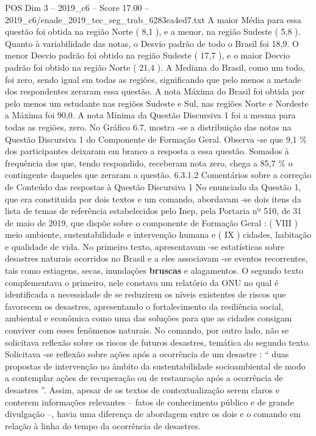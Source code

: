 \begin{textsample}{POS Dim 3 – 2019\_c6 – Score 17.00 – 2019\_c6/enade\_2019\_tec\_seg\_trab\_6283ea4ed7.txt}
A maior Média para essa questão foi obtida na região Norte ( 8,1 ), e a menor, na região Sudeste ( 5,8 ).
Quanto à variabilidade das notas, o Desvio padrão de todo o Brasil foi 18,9.
O menor Desvio padrão foi obtido na região Sudeste ( 17,7 ), e o maior Desvio padrão foi obtido na região Norte ( 21,4 ).
A Mediana do Brasil, como um todo, foi zero, sendo igual em todas as regiões, significando que pelo menos a metade dos respondentes zeraram essa questão.
A nota Máxima do Brasil foi obtida por pelo menos um estudante nas regiões Sudeste e Sul, nas regiões Norte e Nordeste a Máxima foi 90,0.
A nota Mínima da Questão Discursiva 1 foi a mesma para todas as regiões, zero.
No Gráfico 6.7, mostra -se a distribuição das notas na Questão Discursiva 1 do Componente de Formação Geral.
Observa -se que 9,1 \% dos participantes deixaram em branco a resposta a essa questão.
Somados à frequência dos que, tendo respondido, receberam nota zero, chega a 85,7 \% o contingente daqueles que zeraram a questão. 6.3.1.2 Comentários sobre a correção de Conteúdo das respostas à Questão Discursiva 1 No enunciado da Questão 1, que era constituída por dois textos e um comando, abordavam -se dois itens da lista de temas de referência estabelecidos pelo Inep, pela Portaria nº 510, de 31 de maio de 2019, que dispõe sobre o componente de Formação Geral : ( VIII ) meio ambiente, sustentabilidade e intervenção humana e ( IX ) cidades, habitação e qualidade de vida.
No primeiro texto, apresentavam -se estatísticas sobre desastres naturais ocorridos no Brasil e a eles associavam -se eventos recorrentes, tais como estiagens, secas, inundações \textbf{bruscas} e alagamentos.
O segundo texto complementava o primeiro, nele constava um relatório da ONU no qual é identificada a necessidade de se reduzirem os níveis existentes de riscos que favorecem os desastres, apresentando o fortalecimento da resiliência social, ambiental e econômica como uma das soluções para que as cidades consigam conviver com esses fenômenos naturais.
No comando, por outro lado, não se solicitava reflexão sobre os riscos de futuros desastres, temática do segundo texto.
Solicitava -se reflexão sobre ações após a ocorrência de um desastre : “ duas propostas de intervenção no âmbito da sustentabilidade socioambiental de modo a contemplar ações de recuperação ou de restauração após a ocorrência de desastres ”.
Assim, apesar de os textos de contextualização serem claros e conterem informações relevantes – fatos de conhecimento público e de grande divulgação –, havia uma diferença de abordagem entre os dois e o comando em relação à linha do tempo da ocorrência de desastres.

\end{textsample}
